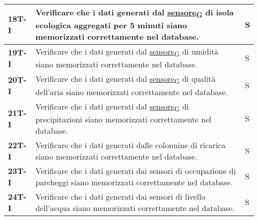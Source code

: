 \begin{longtable}{|>{\raggedright\arraybackslash}m{}|>{\raggedright\arraybackslash}m{}|>{\raggedright\arraybackslash}m{}|}
	\hline
	\textbf{18T-I}  & Verificare che i dati generati dal \href{https://7last.github.io/docs/rtb/documentazione-interna/glossario\#sensore}{sensore\textsubscript{G}} di isola ecologica aggregati per 5 minuti siano memorizzati correttamente nel database.                                                                                              & S              \\
	\hline
	\textbf{19T-I}  & Verificare che i dati generati dal \href{https://7last.github.io/docs/rtb/documentazione-interna/glossario\#sensore}{sensore\textsubscript{G}} di umidità siano memorizzati correttamente nel database.                                                                                                                             & S              \\
	\hline
	\textbf{20T-I}  & Verificare che i dati generati dal \href{https://7last.github.io/docs/rtb/documentazione-interna/glossario\#sensore}{sensore\textsubscript{G}} di qualità dell'aria siano memorizzati correttamente nel database.                                                                                                                   & S              \\
	\hline
	\textbf{21T-I}  & Verificare che i dati generati dal \href{https://7last.github.io/docs/rtb/documentazione-interna/glossario\#sensore}{sensore\textsubscript{G}} di precipitazioni siano memorizzati correttamente nel database.                                                                                                                      & S              \\
	\hline
	\textbf{22T-I}  & Verificare che i dati generati dalle colonnine di ricarica siano memorizzati correttamente nel database.                                                                                                                                                                                                                            & S              \\
	\hline
	\textbf{23T-I}  & Verificare che i dati generati dai sensori di occupazione di parcheggi siano memorizzati correttamente nel database.                                                                                                                                                                                                                & S              \\
	\hline
	\textbf{24T-I}  & Verificare che i dati generati dai sensori di livello dell'acqua siano memorizzati correttamente nel database.                                                                                                                                                                                                                      & S              \\

\end{longtable}
